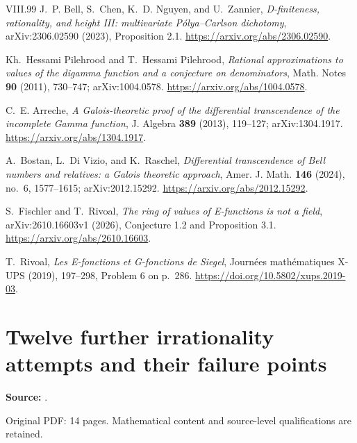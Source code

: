 \documentclass[11pt,a4paper]{article}
\theoremstyle{definition}
\theoremstyle{remark}
\numberwithin{equation}{section}
\renewcommand{\thesection}{\Roman{part}.\arabic{section}}
\renewcommand{\theHsection}{\arabic{part}.main.\arabic{section}}
\begin{document}
\begin{thebibliography}{VIII.99}
J.~P. Bell, S.~Chen, K.~D. Nguyen, and U.~Zannier,
\emph{D-finiteness, rationality, and height III: multivariate
P\'olya--Carlson dichotomy}, arXiv:2306.02590 (2023), Proposition 2.1.
\url{https://arxiv.org/abs/2306.02590}.

Kh.~Hessami Pilehrood and T.~Hessami Pilehrood,
\emph{Rational approximations to values of the digamma function and a
conjecture on denominators}, Math. Notes \textbf{90} (2011), 730--747;
arXiv:1004.0578.
\url{https://arxiv.org/abs/1004.0578}.

C.~E. Arreche, \emph{A Galois-theoretic proof of the differential
transcendence of the incomplete Gamma function},
J. Algebra \textbf{389} (2013), 119--127; arXiv:1304.1917.
\url{https://arxiv.org/abs/1304.1917}.

A.~Bostan, L.~Di Vizio, and K.~Raschel,
\emph{Differential transcendence of Bell numbers and relatives:
a Galois theoretic approach}, Amer. J. Math. \textbf{146} (2024),
no.~6, 1577--1615; arXiv:2012.15292.
\url{https://arxiv.org/abs/2012.15292}.

S.~Fischler and T.~Rivoal,
\emph{The ring of values of E-functions is not a field},
arXiv:2610.16603v1 (2026), Conjecture 1.2 and Proposition 3.1.
\url{https://arxiv.org/abs/2610.16603}.

T.~Rivoal, \emph{Les E-fonctions et G-fonctions de Siegel},
Journ\'ees math\'ematiques X-UPS (2019), 197--298, Problem 6 on p.~286.
\url{https://doi.org/10.5802/xups.2019-03}.

\end{thebibliography}
\label{part3:end}
\clearpage
\setcounter{section}{0}\setcounter{subsection}{0}
\renewcommand{\thesection}{\Roman{part}.\arabic{section}}
\renewcommand{\theHsection}{\arabic{part}.main.\arabic{section}}
\renewcommand{\refname}{References for Part IV}
\part{Twelve further irrationality attempts and their failure points}
\label{part4:start}
\noindent\textbf{Source:} {\small{}}.

Original PDF: 14 pages. Mathematical content and source-level qualifications are retained.
\end{document}
